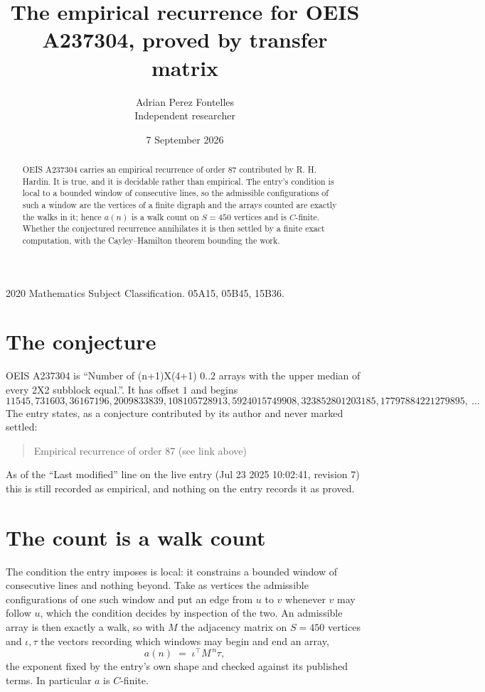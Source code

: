 \documentclass[11pt,a4paper]{article}
\title{The empirical recurrence for OEIS A237304, proved by transfer matrix}
\author{Adrian Perez Fontelles\\ \small Independent researcher}
\date{7 September 2026}
\theoremstyle{plain}
\theoremstyle{definition}
\begin{document}
\maketitle

\begin{abstract}
OEIS A237304 carries an empirical recurrence of order $87$ contributed by R. H. Hardin. It is
true, and it is decidable rather than empirical. The entry's condition is local to a bounded window of consecutive lines, so
the admissible configurations of such a window are the vertices of a finite digraph and the
arrays counted are exactly the walks in it; hence $a(n)$ is a walk count on $S=450$ vertices
and is $C$-finite. Whether the conjectured recurrence annihilates it is then settled by a
finite exact computation, with the Cayley--Hamilton theorem bounding the work.
\end{abstract}

\noindent\small 2020 Mathematics Subject Classification. 05A15, 05B45, 15B36.\normalsize

\section{The conjecture}

OEIS A237304 is ``Number of (n+1)X(4+1) 0..2 arrays with the upper median of every 2X2 subblock equal.''. It has offset $1$ and begins
\[
11545, 731603, 36167196, 2009833839, 108105728913, 5924015749908, 323852801203185, 17797884221279895,\ \dots
\]
The entry states, as a conjecture contributed by its author and never marked settled:
\begin{quote}
Empirical recurrence of order 87 (see link above)
\end{quote}
As of the ``Last modified'' line on the live entry (Jul 23 2025 10:02:41, revision 7) this is still
recorded as empirical, and nothing on the entry records it as proved.

\section{The count is a walk count}

The condition the entry imposes is local: it constrains a bounded window of consecutive lines and nothing beyond. Take as
vertices the admissible configurations of one such window and put an edge from $u$ to $v$
whenever $v$ may follow $u$, which the condition decides by inspection of the two. An
admissible array is then exactly a walk, so with $M$ the adjacency matrix on $S=450$ vertices
and $\iota,\tau$ the vectors recording which windows may begin and end an array,
\[
a(n)\;=\;\iota^{\!\top}M^{\,n}\tau ,
\]
the exponent fixed by the entry's own shape and checked against its published terms. In
particular $a$ is $C$-finite.
\end{document}
